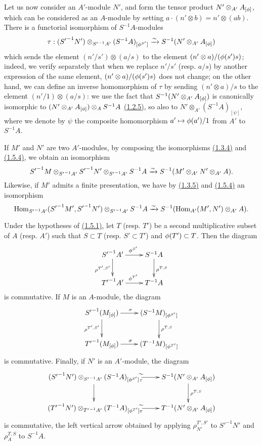 \begin{env}[1.5.4]
\label{0.1.5.4}
Let us now consider an $A'$-module $N'$, and form the tensor product
$N'\otimes_{A'}A_{[\phi]}$, which can be considered as an $A$-module by setting
$a\cdot(n'\otimes b)=n'\otimes(ab)$. There is a functorial isomorphism of
$S^{-1}A$-modules
\[
  \tau:({S'}^{-1}N')\otimes_{{S'}^{-1}A'}(S^{-1}A)_{[\phi^{S'}]}
  \xrightarrow{\sim} S^{-1}(N'\otimes_{A'}A_{[\phi]})
\]
which sends the element $(n'/s')\otimes(a/s)$ to the element
$(n'\otimes a)/(\phi(s')s)$; indeed, we verify separately that when we replace
$n'/s'$ (resp. $a/s$) by another expression of the same element,
$(n'\otimes a)/(\phi(s')s)$ does not change; on the other hand, we can define
an inverse homomorphism of $\tau$ by sending $(n'\otimes a)/s$ to the element
$(n'/1)\otimes(a/s)$: we use the fact that $S^{-1}(N'\otimes_{A'}A_{[\phi]})$
is canonically isomorphic to $(N'\otimes_{A'}A_{[\phi]})\otimes_A S^{-1}A$
\hyperref[0.1.2.5]{(1.2.5)}, so also to $N'\otimes_{A'}(S^{-1}A)_{[\psi]}$, where we
denote by $\psi$ the composite homomorphism $a'\mapsto\phi(a')/1$ from $A'$ to
$S^{-1}A$.
\end{env}

\begin{env}[1.5.5]
\label{0.1.5.5}
If $M'$ and $N'$ are two $A'$-modules, by composing the isomorphisms
\hyperref[0.1.3.4]{(1.3.4)} and \hyperref[0.1.5.4]{(1.5.4)}, we obtain an isomorphism
\[
  {S'}^{-1}M\otimes_{{S'}^{-1}A'}{S'}^{-1}N'\otimes_{{S'}^{-1}A'}S^{-1}A
  \xrightarrow{\sim} S^{-1}(M'\otimes_{A'}N'\otimes_{A'}A).
\]
Likewise, if $M'$ admits a finite presentation, we have by \hyperref[0.1.3.5]{(1.3.5)} and
\hyperref[0.1.5.4]{(1.5.4)} an isomorphism
\[
  {\mathop{\mathrm{Hom}}\nolimits}_{{S'}^{-1}A'}({S'}^{-1}M',{S'}^{-1}N')\otimes_{{S'}^{-1}A'}S^{-1}A
  \xrightarrow{\sim} S^{-1}({\mathop{\mathrm{Hom}}\nolimits}_{A'}(M',N')\otimes_{A'}A).
\]
\end{env}

\begin{env}[1.5.6]
\label{0.1.5.6}
Under the hypotheses of \hyperref[0.1.5.1]{(1.5.1)}, let $T$ (resp. $T'$) be a second
multiplicative subset of $A$ (resp. $A'$) such that $S\subset T$
(resp. $S'\subset T'$) and $\phi(T')\subset T$. Then the diagram
\[
  \xymatrix{
    {S'}^{-1}A'\ar[r]^{\vphi^{S'}}\ar[d]_{\rho^{T',S'}} &
    S^{-1}A\ar[d]^{\rho^{T,S}}\\
    {T'}^{-1}A'\ar[r]^{\vphi^{T'}} &
    T^{-1}A
  }
\]
is commutative. If $M$ is an $A$-module, the diagram
\[
  \xymatrix{
    {S'}^{-1}(M_{[\vphi]})\ar[r]^\sigma\ar[d]_{\rho^{T',S'}} &
    (S^{-1}M)_{[\vphi^{S'}]}\ar[d]^{\rho^{T,S}}\\
    {T'}^{-1}(M_{[\vphi]})\ar[r]^\sigma &
    (T^{-1}M)_{[\vphi^{T'}]}
  }
\]
is commutative. Finally, if $N'$ is an $A'$-module, the diagram
\[
  \xymatrix{
    ({S'}^{-1}N')\otimes_{{S'}^{-1}A'}(S^{-1}A)_{[\vphi^{S'}]}
      \ar[r]^\sim_\tau\ar[d] &
    S^{-1}(N'\otimes_{A'}A_{[\vphi]})\ar[d]^{\rho^{T,S}}\\
    ({T'}^{-1}N')\otimes_{{T'}^{-1}A'}(T^{-1}A)_{[\vphi^{T'}]}
      \ar[r]^\sim_\tau &
    T^{-1}(N'\otimes_{A'}A_{[\vphi]})
  }
\]
is commutative, the left vertical arrow obtained by applying
$\rho_{N'}^{T',S'}$ to ${S'}^{-1}N'$ and $\rho_A^{T,S}$ to $S^{-1}A$.
\end{env}


